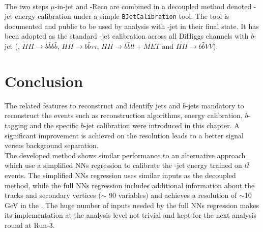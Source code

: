 \\
The two steps $\mu$-in-jet and \pT-Reco are combined in a decoupled method denoted \bq-jet energy calibration under a simple \texttt{BJetCalibration} tool. The tool is documented and public to be used by analysis with \bq-jet in their final state. It has been adopted as the standard \bq-jet calibration across all DiHiggs channels with $b$-jet (\HHyybb, $HH\rightarrow b\bar{b}b\bar{b}$, $HH\rightarrow b\bar{b}\tau\tau$,  $HH\rightarrow b\bar{b}ll+MET$ and $HH\rightarrow b\bar{b}VV$).

\section{Conclusion}
\label{Jet:Conc}
The related features to reconstruct and identify jets and $b$-jets mandatory to reconstruct the \HHyybb events such as reconstruction algorithms, energy calibration, $b$-tagging and the specific $b$-jet calibration were introduced in this chapter. A significant improvement is achieved on the \mbb resolution leads to a better signal versus background separation.\\
The developed method shows similar performance to an alternative approach which use a simplified NNs regression to calibrate the \bq-jet energy trained on $t\bar{t}$ events. The simplified NNs regression uses similar inputs as the decoupled method, while the full NNs regression includes additional information about the tracks and secondary vertices ($\sim$ 90 variables) and achieves a resolution of $\sim$10 GeV in the \mbb. The huge number of inputs needed by the full NNs regression makes its implementation at the analysis level not trivial and kept for the next analysis round at Run-3.